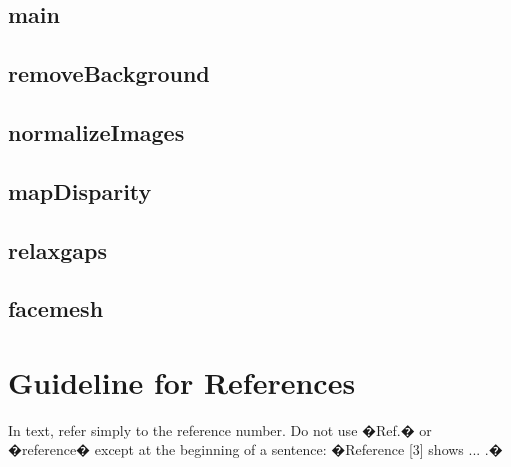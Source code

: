 \documentclass[journal]{IEEEtran}
\begin{document}
%
\subsection{main}
\label{sec:main}


\subsection{removeBackground}
\label{sec:removeBackground}


\subsection{normalizeImages}
\label{sec:normalizeImages}


\subsection{mapDisparity}
\label{sec:mapDisparity}


\subsection{relaxgaps}
\label{sec:relaxgaps}


\subsection{facemesh}
\label{sec:facemesh}




\section{Guideline for References}
In text, refer simply to the reference number. Do not use �Ref.� or �reference� except at the beginning of a sentence: �Reference [3] shows ... .� 




\ifCLASSOPTIONcaptionsoff
  \newpage
\fi
\end{document}
